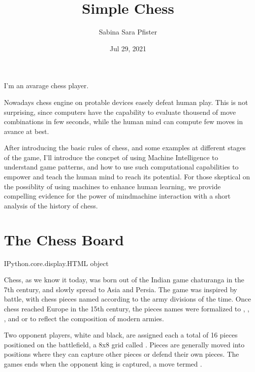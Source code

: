 \documentclass[letterpaper,10pt,english]{jupyterBook}
\title{Simple Chess}
\date{Jul 29, 2021}
\author{Sabina Sara Pfister}
\begin{document}
\pagestyle{empty}
\sphinxmaketitle
\pagestyle{plain}
\sphinxtableofcontents
\pagestyle{normal}
\label{\detokenize{intro::doc}}


\sphinxAtStartPar
I’m an avarage chess player.

\sphinxAtStartPar
Nowadays chess engine on protable devices easely defeat human play. This is not surprising, since computers have the capability to evaluate thousend of move combinations in few seconds, while the human mind can compute few moves in avance at best.

\sphinxAtStartPar
After introducing the basic rules of chess, and some examples at different stages of the game, I’ll introduce the concpet of using Machine Intelligence to understand game patterns, and how to use such computational capabilities to empower and teach the human mind to reach its potential. For those skeptical on the possiblity of using machines to enhance human learning, we provide compelling evidence for the power of mind\sphinxhyphen{}machine interaction with a short analysis of the history of chess.


\chapter{The Chess Board}
\label{\detokenize{chapter1:the-chess-board}}\label{\detokenize{chapter1::doc}}
\begin{sphinxVerbatim}[commandchars=\\\{\}]
\PYGZlt{}IPython.core.display.HTML object\PYGZgt{}
\end{sphinxVerbatim}

\sphinxAtStartPar
Chess, as we know it today, was born out of the Indian game chaturanga in the 7th century, and slowly spread to Asia and Persia. The game was inspired by battle, with chess pieces named according to the army divisions of the time. Once chess reached Europe in the 15th century, the pieces names were formalized to , , ,  and  or  to reflect the composition of modern armies.

\sphinxAtStartPar
Two opponent players, white and black, are assigned each a total of 16 pieces positioned on the battlefield, a 8x8 grid called . Pieces are generally moved into positions where they can capture other pieces or defend their own pieces. The games ends when the opponent king is captured, a move termed .
\end{document}
